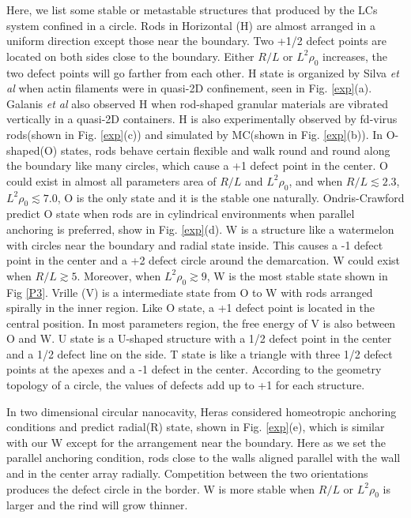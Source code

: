 \documentclass[prl,twocolumn,preprintnumbers,reprint]{revtex4}
\begin{document}
Here, we list some stable or metastable structures that produced by the LCs system confined in a circle. Rods in Horizontal (H) are almost arranged in a uniform direction except those near the boundary. Two +1/2 defect points are located on both sides close to the boundary. Either $R/L$ or $L^2\rho_0$ increases, the two defect points will go farther from each other. H state is organized by Silva \emph{et al} when actin filaments were in quasi-2D confinement\cite{Silva2011Self}, seen in Fig. \ref{exp}(a). Galanis \emph{et al} also observed H when rod-shaped granular materials are vibrated vertically in a quasi-2D containers\cite{Galanis2006Spontaneous}. H is also experimentally observed by fd-virus rods(shown in Fig. \ref{exp}(c)) and simulated by MC(shown in Fig. \ref{exp}(b))\cite{G2016Finite}. In O-shaped(O) states, rods behave certain flexible and walk round and round along the boundary like many circles, which cause a +1 defect point in the center. O could exist in almost all parameters area of $R/L$ and $L^2\rho_0$, and when $R/L\lesssim2.3$, $L^2\rho_0\lesssim7.0$, O is the only state and it is the stable one naturally. Ondris-Crawford predict O state when rods are in cylindrical environments when parallel anchoring is preferred, show in Fig. \ref{exp}(d). W is a structure like a watermelon with circles near the boundary and radial state  inside. This causes a -1 defect point in the center and a +2 defect circle around the demarcation. W could exist when $R/L\gtrsim5$. Moreover, when $L^2\rho_0\gtrsim9$, W is the most stable state shown in Fig \ref{P3}. Vrille (V) is a intermediate state from O to W with rods arranged spirally in the inner region. Like O state, a +1 defect point is located in the central position. In most parameters region, the free energy of V is also between O and W. U state is a U-shaped structure with a 1/2 defect point in the center and a 1/2 defect line on the side. T state is like a triangle with three 1/2 defect points at the apexes and a -1 defect in the center. According to the geometry topology of a circle, the values of defects add up to +1 for each structure.

In two dimensional circular nanocavity, Heras considered homeotropic anchoring conditions and predict radial(R) state\cite{De2009Topological}, shown in Fig. \ref{exp}(e), which is similar with our W except for the arrangement near the boundary. Here as we set the parallel anchoring condition, rods close to the walls aligned parallel with the wall and in the center array radially. Competition between the two orientations produces the defect circle in the border. W is more stable when $R/L$ or $L^2\rho_0$ is larger and the rind will grow thinner.
\end{document}

